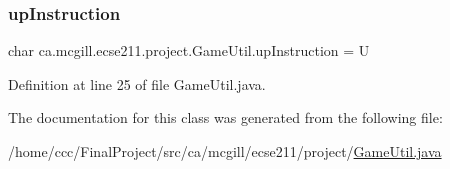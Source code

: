 \subsubsection{\texorpdfstring{up\+Instruction}{upInstruction}}
{\footnotesize\ttfamily char ca.\+mcgill.\+ecse211.\+project.\+Game\+Util.\+up\+Instruction = \textquotesingle{}U\textquotesingle{}\hspace{0.3cm}{\ttfamily [static]}}



Definition at line 25 of file Game\+Util.\+java.



The documentation for this class was generated from the following file\+:\begin{DoxyCompactItemize}
\item 
/home/ccc/\+Final\+Project/src/ca/mcgill/ecse211/project/\hyperlink{_game_util_8java}{Game\+Util.\+java}\end{DoxyCompactItemize}
